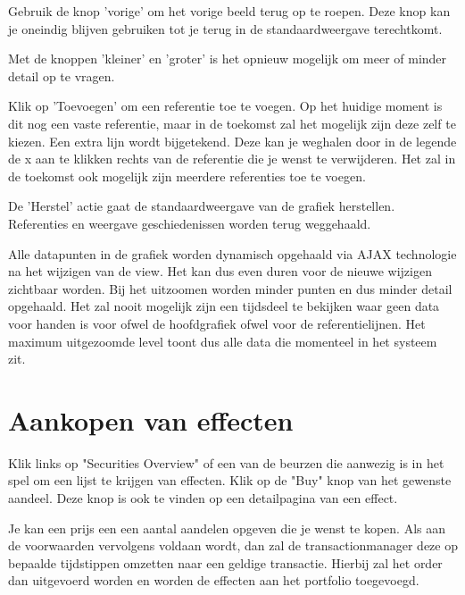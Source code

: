 Gebruik de knop 'vorige' om het vorige beeld terug op te roepen. Deze knop kan je oneindig blijven gebruiken tot je terug in de standaardweergave terechtkomt.

Met de knoppen 'kleiner' en 'groter' is het opnieuw mogelijk om meer of minder detail op te vragen.

Klik op 'Toevoegen' om een referentie toe te voegen. Op het huidige moment is dit nog een vaste referentie, maar in de toekomst zal het mogelijk zijn deze zelf te kiezen. Een extra lijn wordt bijgetekend. Deze kan je weghalen door in de legende de x aan te klikken rechts van de referentie die je wenst te verwijderen.
Het zal in de toekomst ook mogelijk zijn meerdere referenties toe te voegen.

De 'Herstel' actie gaat de standaardweergave van de grafiek herstellen. Referenties en weergave geschiedenissen worden terug weggehaald.

Alle datapunten in de grafiek worden dynamisch opgehaald via AJAX technologie na het wijzigen van de view. Het kan dus even duren voor de nieuwe wijzigen zichtbaar worden. Bij het uitzoomen worden minder punten en dus minder detail opgehaald. Het zal nooit mogelijk zijn een tijdsdeel te bekijken waar geen data voor handen is voor ofwel de hoofdgrafiek ofwel voor de referentielijnen. Het maximum uitgezoomde level toont dus alle data die momenteel in het systeem zit.

\section{Aankopen van effecten}

Klik links op "Securities Overview" of een van de beurzen die aanwezig is in het spel om een lijst te krijgen van effecten. Klik op de "Buy" knop van het gewenste aandeel. Deze knop is ook te vinden op een detailpagina van een effect.

Je kan een prijs een een aantal aandelen opgeven die je wenst te kopen. Als aan de voorwaarden vervolgens voldaan wordt, dan zal de transactionmanager deze op bepaalde tijdstippen omzetten naar een geldige transactie. Hierbij zal het order dan uitgevoerd worden en worden de effecten aan het portfolio toegevoegd.